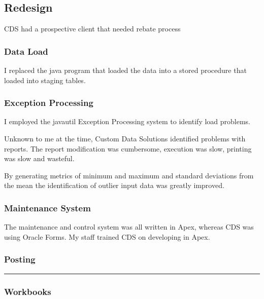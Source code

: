 \documentclass[letterpaper,10pt,english]{sphinxmanual}
\begin{document}
\subsection{Redesign}
\label{\detokenize{Contributions:redesign}}
CDS had a prospective client that needed rebate process


\subsubsection{Data Load}
\label{\detokenize{Contributions:data-load}}
I replaced the java program that loaded the data into a stored procedure
that loaded into staging tables.


\subsubsection{Exception Processing}
\label{\detokenize{Contributions:exception-processing}}
I employed the javautil Exception Processing system to identify load problems.

Unknown to me at the time, Custom Data Solutions identified problems with reports.
The report modification was cumbersome, execution was slow, printing was slow
and wasteful.

By generating metrics of minimum and maximum and standard deviations from
the mean the identification of outlier input data was greatly improved.


\subsubsection{Maintenance System}
\label{\detokenize{Contributions:maintenance-system}}
The maintenance and control system was all written in Apex, whereas CDS was
using Oracle Forms.  My staff trained CDS on developing in Apex.


\subsubsection{Posting}
\label{\detokenize{Contributions:posting}}

\bigskip\hrule\bigskip



\subsubsection{Workbooks}
\label{\detokenize{Contributions:workbooks}}
\end{document}
